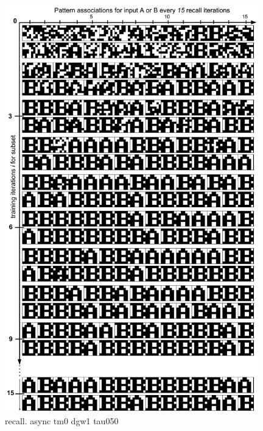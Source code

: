 \begin{figure}
    \centering
    \includegraphics[width=11cm]{fig/AB-pattern-associations-async-tm0-dgw1-tau050}
    \caption{recall. async tm0 dgw1 tau050}
    \label{fig:low-level-3}
\end{figure}

